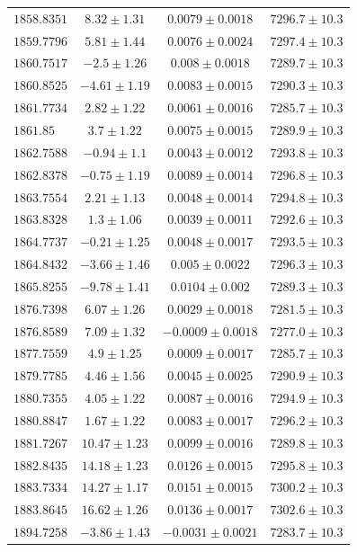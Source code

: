 \documentclass[fleqn,usenatbib]{mnras}
\begin{document}
\begin{table}
\begin{tabular}{lccc}
$1858.8351$ & $8.32\pm1.31$ & $0.0079\pm0.0018$ & $7296.7\pm10.3$ \\
$1859.7796$ & $5.81\pm1.44$ & $0.0076\pm0.0024$ & $7297.4\pm10.3$ \\
$1860.7517$ & $-2.5\pm1.26$ & $0.008\pm0.0018$ & $7289.7\pm10.3$ \\
$1860.8525$ & $-4.61\pm1.19$ & $0.0083\pm0.0015$ & $7290.3\pm10.3$ \\
$1861.7734$ & $2.82\pm1.22$ & $0.0061\pm0.0016$ & $7285.7\pm10.3$ \\
$1861.85$ & $3.7\pm1.22$ & $0.0075\pm0.0015$ & $7289.9\pm10.3$ \\
$1862.7588$ & $-0.94\pm1.1$ & $0.0043\pm0.0012$ & $7293.8\pm10.3$ \\
$1862.8378$ & $-0.75\pm1.19$ & $0.0089\pm0.0014$ & $7296.8\pm10.3$ \\
$1863.7554$ & $2.21\pm1.13$ & $0.0048\pm0.0014$ & $7294.8\pm10.3$ \\
$1863.8328$ & $1.3\pm1.06$ & $0.0039\pm0.0011$ & $7292.6\pm10.3$ \\
$1864.7737$ & $-0.21\pm1.25$ & $0.0048\pm0.0017$ & $7293.5\pm10.3$ \\
$1864.8432$ & $-3.66\pm1.46$ & $0.005\pm0.0022$ & $7296.3\pm10.3$ \\
$1865.8255$ & $-9.78\pm1.41$ & $0.0104\pm0.002$ & $7289.3\pm10.3$ \\
$1876.7398$ & $6.07\pm1.26$ & $0.0029\pm0.0018$ & $7281.5\pm10.3$ \\
$1876.8589$ & $7.09\pm1.32$ & $-0.0009\pm0.0018$ & $7277.0\pm10.3$ \\
$1877.7559$ & $4.9\pm1.25$ & $0.0009\pm0.0017$ & $7285.7\pm10.3$ \\
$1879.7785$ & $4.46\pm1.56$ & $0.0045\pm0.0025$ & $7290.9\pm10.3$ \\
$1880.7355$ & $4.05\pm1.22$ & $0.0087\pm0.0016$ & $7294.9\pm10.3$ \\
$1880.8847$ & $1.67\pm1.22$ & $0.0083\pm0.0017$ & $7296.2\pm10.3$ \\
$1881.7267$ & $10.47\pm1.23$ & $0.0099\pm0.0016$ & $7289.8\pm10.3$ \\
$1882.8435$ & $14.18\pm1.23$ & $0.0126\pm0.0015$ & $7295.8\pm10.3$ \\
$1883.7334$ & $14.27\pm1.17$ & $0.0151\pm0.0015$ & $7300.2\pm10.3$ \\
$1883.8645$ & $16.62\pm1.26$ & $0.0136\pm0.0017$ & $7302.6\pm10.3$ \\
$1894.7258$ & $-3.86\pm1.43$ & $-0.0031\pm0.0021$ & $7283.7\pm10.3$ \\

\end{tabular}
\end{table}
\end{document}
